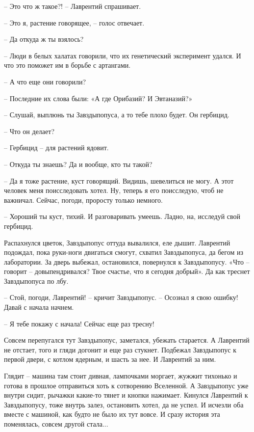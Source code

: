 \documentclass[ebook,oneside,final,openright]{memoir}
\begin{document}
\par
– Это что ж такое?! – Лаврентий спрашивает.\par
– Это я, растение говорящее, – голос отвечает.\par
– Да откуда ж ты взялось?\par
– Люди в белых халатах говорили, что их генетический эксперимент удался. И что это поможет им в борьбе с артангами.\par
– А что еще они говорили?\par
– Последние их слова были: «А где Орибазий? И Эвтаназий?»\par
– Слушай, выплюнь ты Завздыпопуса, а то тебе плохо будет. Он гербицид.\par
– Что он делает?\par
– Гербицид – для растений ядовит.\par
– Откуда ты знаешь? Да и вообще, кто ты такой?\par
– Да я тоже растение, куст говорящий. Видишь, шевелиться не могу. А этот человек меня поисследовать хотел. Ну, теперь я его поисследую, чтоб не важничал. Сейчас, погоди, проросту только немного.\par
– Хороший ты куст, тихий. И разговаривать умеешь. Ладно, на, исследуй свой гербицид.\par
\par
Распахнулся цветок, Завздыпопус оттуда вывалился, еле дышит. Лаврентий подождал, пока руки-ноги двигаться смогут, схватил Завздыпопуса, да бегом из лаборатории. За дверь выбежал, остановился, повернулся к Завздыпопусу. «Что – говорит – довыпендривался? Твое счастье, что я сегодня добрый». Да как треснет Завздыпопуса по лбу.\par
\par
– Стой, погоди, Лаврентий! – кричит Завздыпопус. – Осознал я свою ошибку! Давай с начала начнем.\par
– Я тебе покажу с начала! Сейчас еще раз тресну!\par
\par
Совсем перепугался тут Завздыпопус, заметался, убежать старается. А Лаврентий не отстает, того и гляди догонит и еще раз стукнет. Подбежал Завздыпопус к первой двери, с котлом ядерным, и шасть за нее. И Лаврентий за ним.\par
\par
Глядит – машина там стоит дивная, лампочками моргает, жужжит тихонько и готова в прошлое отправиться хоть к сотворению Вселенной. А Завздыпопус уже внутри сидит, рычажки какие-то тянет и кнопки нажимает. Кинулся Лаврентий к Завздыпопусу, тоже внутрь залез, остановить хотел, да не успел. И исчезли оба вместе с машиной, как будто не было их тут вовсе. И сразу история эта поменялась, совсем другой стала...\par
\end{document}
